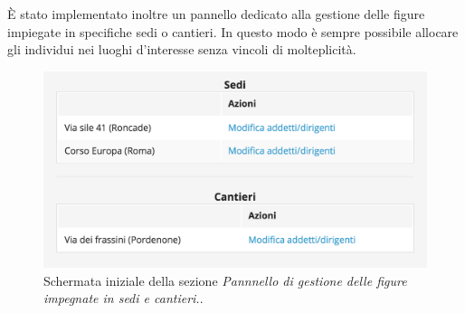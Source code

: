 	È stato implementato inoltre un pannello dedicato alla gestione delle figure impiegate in specifiche sedi o cantieri. In questo modo è sempre possibile allocare gli individui nei luoghi d'interesse senza vincoli di molteplicità.\\
	\begin{figure}[H]
		\begin{center}
			\includegraphics[width=12cm]{Pics/ScreenfigureDiCantiere.png}
			\caption{
				Schermata iniziale della sezione \textit{Pannnello di gestione delle figure impegnate in sedi e cantieri.}.}
			\label{fig:ScreenPrincipaleFigureSediCantieri}
		\end{center}
	\end{figure}

